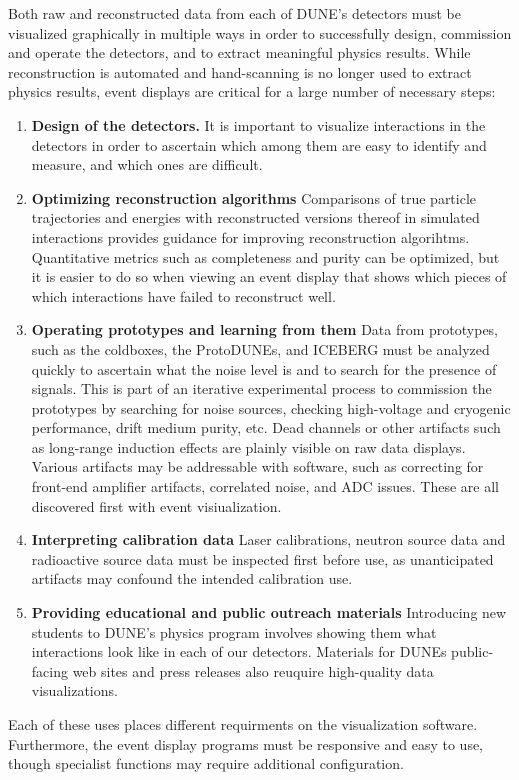 \documentclass[../main-v1.tex]{subfiles}
\begin{document}
Both raw and reconstructed data from each of DUNE's detectors must be visualized graphically in multiple ways in order to successfully design, commission and operate the detectors, and to extract meaningful physics results.  While reconstruction is automated and hand-scanning is no longer used to extract physics results, event displays are critical for a large number of necessary steps:
\begin{enumerate}
    \item {\bf Design of the detectors.}   It is important to visualize interactions in the detectors in order to ascertain which among them are easy to identify and measure, and which ones are difficult.
    \item{\bf Optimizing reconstruction algorithms}  Comparisons of true particle trajectories and energies with reconstructed versions thereof in simulated interactions provides guidance for improving reconstruction algorihtms.  Quantitative metrics such as completeness and purity can be optimized, but it is easier to do so when viewing an event display that shows which pieces of which interactions have failed to reconstruct well.
    \item{\bf Operating prototypes and learning from them}  Data from prototypes, such as the coldboxes, the ProtoDUNEs, and ICEBERG must be analyzed quickly to ascertain what the noise level is and to search for the presence of signals.  This is part of an iterative experimental process to commission the prototypes by searching for noise sources, checking high-voltage and cryogenic performance, drift medium purity, etc.  Dead channels or other artifacts such as long-range induction effects are plainly visible on raw data displays.  Various artifacts may be addressable with software, such as correcting for front-end amplifier artifacts, correlated noise, and ADC issues.  These are all discovered first with event visiualization.
    \item{\bf Interpreting calibration data}  Laser calibrations, neutron source data and radioactive source data must be inspected first before use, as unanticipated artifacts may confound the intended calibration use.
    \item{\bf Providing educational and public outreach materials}  Introducing new students to DUNE's physics program involves showing them what interactions look like in each of our detectors.  Materials for DUNEs public-facing web sites and press releases also reuquire high-quality data visualizations.
\end{enumerate}
Each of these uses places different requirments on the visualization software.  Furthermore, the event display programs must be responsive and easy to use, though specialist functions may require additional configuration.
\end{document}
